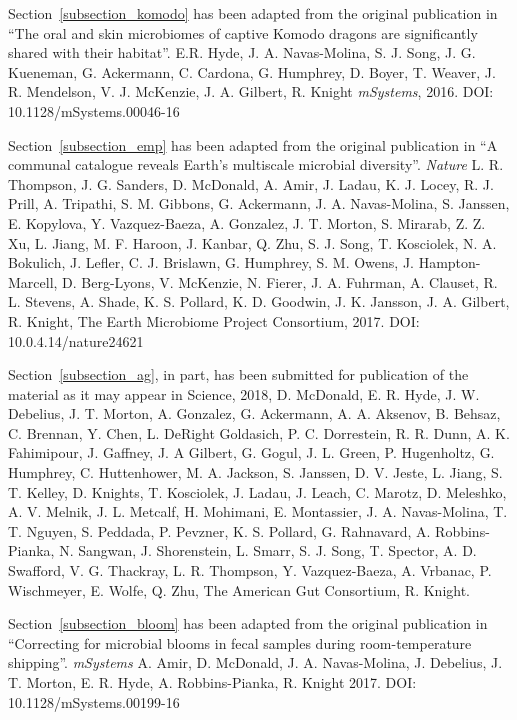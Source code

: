 \begin{frontmatter}
\begin{acknowledgements}
    Section~\ref{subsection_komodo} has been adapted from the original publication in
    ``The oral and skin microbiomes of captive Komodo dragons are significantly shared
    with their habitat''. E.R. Hyde, J. A. Navas-Molina, S. J. Song, J. G. Kueneman,
    G. Ackermann, C. Cardona, G. Humphrey, D. Boyer, T. Weaver, J. R. Mendelson,
    V. J. McKenzie, J. A. Gilbert, R. Knight \emph{mSystems}, 2016. DOI: 10.1128/mSystems.00046-16

    Section~\ref{subsection_emp} has been adapted from the original publication in
    ``A communal catalogue reveals Earth's multiscale microbial diversity''.
    \emph{Nature} L. R. Thompson, J. G. Sanders, D. McDonald, A. Amir,
    J. Ladau, K. J. Locey, R. J. Prill, A. Tripathi, S. M. Gibbons, G. Ackermann,
    J. A. Navas-Molina, S. Janssen, E. Kopylova, Y. Vazquez-Baeza, A. Gonzalez,
    J. T. Morton, S. Mirarab, Z. Z. Xu, L. Jiang, M. F. Haroon, J. Kanbar, Q. Zhu,
    S. J. Song, T. Kosciolek, N. A. Bokulich, J. Lefler, C. J. Brislawn, G. Humphrey,
    S. M. Owens, J. Hampton-Marcell, D. Berg-Lyons, V. McKenzie, N. Fierer, J. A. Fuhrman,
    A. Clauset, R. L. Stevens, A. Shade, K. S. Pollard, K. D. Goodwin, J. K. Jansson,
    J. A. Gilbert, R. Knight, The Earth Microbiome Project Consortium, 2017. DOI: 10.0.4.14/nature24621

    Section~\ref{subsection_ag}, in part, has been submitted for publication of the
    material as it may appear in Science, 2018, D. McDonald, E. R. Hyde, J. W. Debelius,
    J. T. Morton, A. Gonzalez, G. Ackermann, A. A. Aksenov, B. Behsaz, C. Brennan,
    Y. Chen, L. DeRight Goldasich, P. C. Dorrestein, R. R. Dunn, A. K. Fahimipour,
    J. Gaffney, J. A Gilbert, G. Gogul, J. L. Green, P. Hugenholtz, G. Humphrey,
    C. Huttenhower, M. A. Jackson, S. Janssen, D. V. Jeste, L. Jiang, S. T. Kelley,
    D. Knights, T. Kosciolek, J. Ladau, J. Leach, C. Marotz, D. Meleshko, A. V. Melnik,
    J. L. Metcalf, H. Mohimani, E. Montassier, J. A. Navas-Molina, T. T. Nguyen,
    S. Peddada, P. Pevzner, K. S. Pollard, G. Rahnavard, A. Robbins-Pianka,
    N. Sangwan, J. Shorenstein, L. Smarr, S. J. Song, T. Spector, A. D. Swafford,
    V. G. Thackray, L. R. Thompson, Y. Vazquez-Baeza, A. Vrbanac, P. Wischmeyer,
    E. Wolfe, Q. Zhu, The American Gut Consortium, R. Knight.

    Section~\ref{subsection_bloom} has been adapted from the original publication in
    ``Correcting for microbial blooms in fecal samples during room-temperature shipping''.
    \emph{mSystems} A. Amir, D. McDonald, J. A. Navas-Molina, J. Debelius, J. T. Morton,
    E. R. Hyde, A. Robbins-Pianka, R. Knight 2017. DOI: 10.1128/mSystems.00199-16


\end{acknowledgements}
\end{frontmatter}
